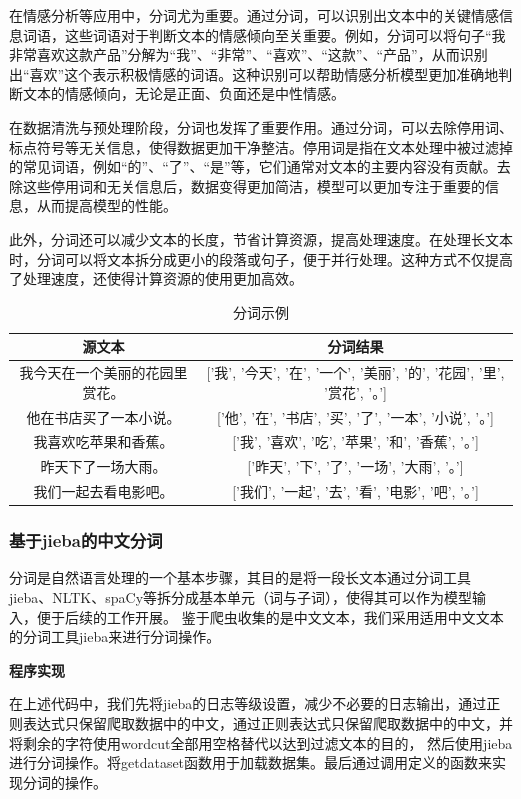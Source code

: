 \documentclass[UTF8,a4paper,15pt,titlepage,oneside]{ctexbook}
\begin{document}
在情感分析等应用中，分词尤为重要。通过分词，可以识别出文本中的关键情感信息词语，这些词语对于判断文本的情感倾向至关重要。例如，分词可以将句子“我非常喜欢这款产品”分解为“我”、“非常”、“喜欢”、“这款”、“产品”，从而识别出“喜欢”这个表示积极情感的词语。这种识别可以帮助情感分析模型更加准确地判断文本的情感倾向，无论是正面、负面还是中性情感。

在数据清洗与预处理阶段，分词也发挥了重要作用。通过分词，可以去除停用词、标点符号等无关信息，使得数据更加干净整洁。停用词是指在文本处理中被过滤掉的常见词语，例如“的”、“了”、“是”等，它们通常对文本的主要内容没有贡献。去除这些停用词和无关信息后，数据变得更加简洁，模型可以更加专注于重要的信息，从而提高模型的性能。

此外，分词还可以减少文本的长度，节省计算资源，提高处理速度。在处理长文本时，分词可以将文本拆分成更小的段落或句子，便于并行处理。这种方式不仅提高了处理速度，还使得计算资源的使用更加高效。

\begin{table}[H]
  \centering
  \begin{tabular}{cc}
  \toprule
  源文本 & 分词结果\\
  \midrule
  我今天在一个美丽的花园里赏花。&	['我', '今天', '在', '一个', '美丽', '的', '花园', '里', '赏花', '。']\\
  他在书店买了一本小说。&	['他', '在', '书店', '买', '了', '一本', '小说', '。']\\
  我喜欢吃苹果和香蕉。&	['我', '喜欢', '吃', '苹果', '和', '香蕉', '。']\\
  昨天下了一场大雨。&	['昨天', '下', '了', '一场', '大雨', '。']\\
  我们一起去看电影吧。&	['我们', '一起', '去', '看', '电影', '吧', '。']\\
  \bottomrule
  \end{tabular}
  \caption{分词示例}
  \end{table}

\subsubsection{基于jieba的中文分词}

分词是自然语言处理的一个基本步骤，其目的是将一段长文本通过分词工具jieba、NLTK、spaCy等拆分成基本单元（词与子词），使得其可以作为模型输入，便于后续的工作开展。
鉴于爬虫收集的是中文文本，我们采用适用中文文本的分词工具jieba来进行分词操作。

\vskip 0.2cm
\noindent
\textbf{程序实现}

在上述代码中，我们先将jieba的日志等级设置，减少不必要的日志输出，通过正则表达式只保留爬取数据中的中文，通过正则表达式只保留爬取数据中的中文，并将剩余的字符使用word\;cut全部用空格替代以达到过滤文本的目的，
然后使用jieba进行分词操作。将get\;dataset函数用于加载数据集。最后通过调用定义的函数来实现分词的操作。
\end{document}
